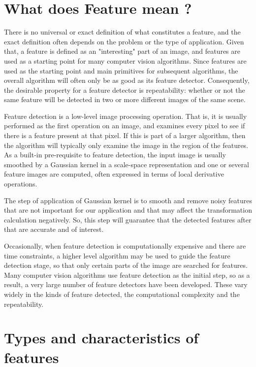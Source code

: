 \section{What does Feature mean ?}
There is no universal or exact definition of what constitutes a feature, and the exact definition often depends on the problem or the type of application. Given that, a feature is defined as an "interesting" part of an image, and features are used as a starting point for many computer vision algorithms. Since features are used as the starting point and main primitives for subsequent algorithms, the overall algorithm will often only be as good as its feature detector. Consequently, the desirable property for a feature detector is repeatability: whether or not the same feature will be detected in two or more different images of the same scene.

Feature detection is a low-level image processing operation. That is, it is usually performed as the first operation on an image, and examines every pixel to see if there is a feature present at that pixel. If this is part of a larger algorithm, then the algorithm will typically only examine the image in the region of the features. As a built-in pre-requisite to feature detection, the input image is usually smoothed by a Gaussian kernel in a scale-space representation and one or several feature images are computed, often expressed in terms of local derivative operations.

The step of application of Gaussian kernel is to smooth and remove noisy features that are not important for our application and that may affect the transformation calculation negatively. So, this step will guarantee that the detected features after that are accurate and of interest.

Occasionally, when feature detection is computationally expensive and there are time constraints, a higher level algorithm may be used to guide the feature detection stage, so that only certain parts of the image are searched for features.
Many computer vision algorithms use feature detection as the initial step, so as a result, a very large number of feature detectors have been developed. These vary widely in the kinds of feature detected, the computational complexity and the repeatability. 


\section{Types and characteristics of features}

